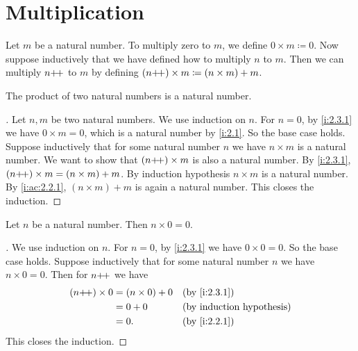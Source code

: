 \section{Multiplication}\label{i:sec:2.3}

\begin{defn}\label{i:2.3.1}
  Let \(m\) be a natural number.
  To multiply zero to \(m\), we define \(0 \times m \coloneqq 0\).
  Now suppose inductively that we have defined how to multiply \(n\) to \(m\).
  Then we can multiply \(n{+}\!{+}\) to \(m\) by defining \((n{+}\!{+}) \times m \coloneqq (n \times m) + m\).
\end{defn}

\begin{ac}\label{i:ac:2.3.1}
  The product of two natural numbers is a natural number.
\end{ac}

\begin{proof}[]
  Let \(n, m\) be two natural numbers.
  We use induction on \(n\).
  For \(n = 0\), by \cref{i:2.3.1} we have \(0 \times m = 0\), which is a natural number by \cref{i:2.1}.
  So the base case holds.
  Suppose inductively that for some natural number \(n\) we have \(n \times m\) is a natural number.
  We want to show that \((n{+}\!{+}) \times m\) is also a natural number.
  By \cref{i:2.3.1}, \((n{+}\!{+}) \times m = (n \times m) + m\).
  By induction hypothesis \(n \times m\) is a natural number.
  By \cref{i:ac:2.2.1}, \((n \times m) + m\) is again a natural number.
  This closes the induction.
\end{proof}

\begin{ac}\label{i:ac:2.3.2}
  Let \(n\) be a natural number.
  Then \(n \times 0 = 0\).
\end{ac}

\begin{proof}[]
  We use induction on \(n\).
  For \(n = 0\), by \cref{i:2.3.1} we have \(0 \times 0 = 0\).
  So the base case holds.
  Suppose inductively that for some natural number \(n\) we have \(n \times 0 = 0\).
  Then for \(n{+}\!{+}\) we have
  \begin{align*}
    (n\pp) \times 0 & = (n \times 0) + 0 &  & \by{i:2.3.1} \\
                    & = 0 + 0            &  & \byIH        \\
                    & = 0.               &  & \by{i:2.2.1}
  \end{align*}
  This closes the induction.
\end{proof}

